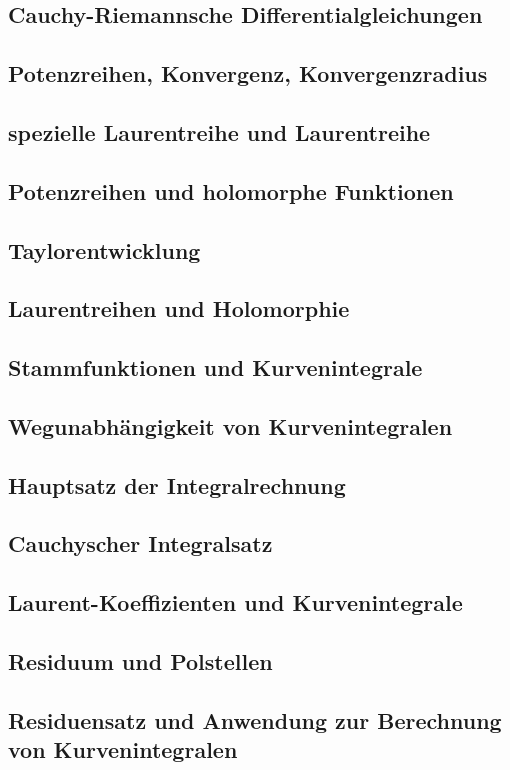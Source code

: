 \subsection{Cauchy-Riemannsche Differentialgleichungen}
\subsection{Potenzreihen, Konvergenz, Konvergenzradius}
\subsection{spezielle Laurentreihe und Laurentreihe}
\subsection{Potenzreihen und holomorphe Funktionen}
\subsection{Taylorentwicklung}
\subsection{Laurentreihen und Holomorphie}
\subsection{Stammfunktionen und Kurvenintegrale}
\subsection{Wegunabhängigkeit von Kurvenintegralen}
\subsection{Hauptsatz der Integralrechnung}
\subsection{Cauchyscher Integralsatz}
\subsection{Laurent-Koeffizienten und Kurvenintegrale}
\subsection{Residuum und Polstellen}
\subsection{Residuensatz und Anwendung zur Berechnung von Kurvenintegralen}
